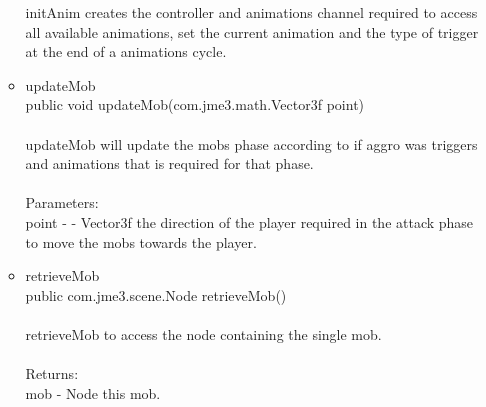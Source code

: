 \documentclass[letterpaper]{article}
\begin{document}
\begin{itemize}
\begin{itemize}
											initAnim creates the controller and animations channel required to access all available animations, set the current animation and the type of trigger at the end of a animations cycle.
									\item	updateMob \\
											public void updateMob(com.jme3.math.Vector3f point) \\ \\
											updateMob will update the mobs phase according to if aggro was triggers and animations that is required for that phase. \\ \\
											Parameters: \\
											point - - Vector3f the direction of the player required in the attack phase to move the mobs towards the player.
									\item	retrieveMob \\
											public com.jme3.scene.Node retrieveMob() \\ \\
											retrieveMob to access the node containing the single mob. \\ \\
											Returns: \\
											mob - Node this mob.
								\end{itemize}
					\end{itemize}
					
				\vspace{0.2in}
\end{document}
